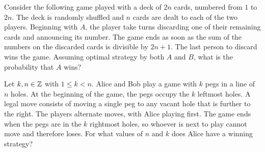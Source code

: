 \documentclass{article}
\begin{document}
\begin{exercise}[1993 B2]
Consider the following game played with a deck of $2n$ cards, numbered from $1$ to $2n$. The deck is randomly shuffled and $n$ cards are dealt to each of the two players. Beginning with $A$, the player take turns discarding one of their remaining cards and announcing its number. The game ends as soon as the sum of the numbers on the discarded cards is divisible by $2n+1$. The last person to discard wins the game. Assuming optimal strategy by both $A$ and $B$, what is the probability that $A$ wins?
\end{exercise}

\begin{exercise}[2020 B2]
    Let \(k,n\in\mathbb{Z}\) with \(1\leq k<n\).
    Alice and Bob play a game with \(k\) pegs in a line of \(n\) holes.
    At the beginning of the game, the pegs occupy the \(k\) leftmost holes.
    A legal move consists of moving a single peg to any vacant hole that is further to the right.
    The players alternate moves, with Alice playing first.
    The game ends when the pegs are in the \(k\) rightmost holes, so whoever is next to play cannot move and therefore loses.
    For what values of \(n\) and \(k\) does Alice have a winning strategy?
\end{exercise}
\end{document}
